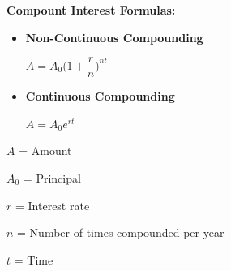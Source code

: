 \documentclass[12pt]{article}
\newenvironment{myindentpar}[1]%
     {\begin{list}{}%
             {\setlength{\leftmargin}{#1}}%
             \item[]%
     }
     {\end{list}}
\begin{document}
\textbf{Compount Interest Formulas:}

\begin{myindentpar}{2cm}

\begin{itemize}
\item \textbf{Non-Continuous Compounding}
\newline

\centerline{$A = A_{0}\Big(1+ \dfrac{r}{n}\Big)^{nt}$}


\item \textbf{Continuous Compounding}
\newline

\centerline{$A = A_{0}e^{rt}$}

\end{itemize}

$A$ = Amount

$A_{0}$ = Principal

$r$ = Interest rate

$n$ = Number of times compounded per year

$t$ = Time
\end{myindentpar}
\end{document}
